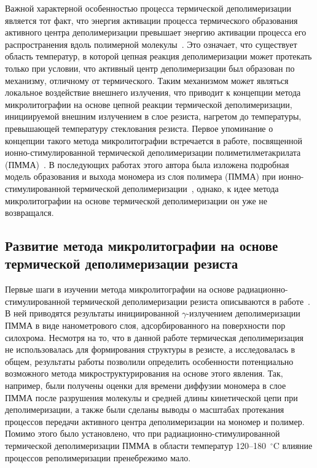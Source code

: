 Важной характерной особенностью процесса термической деполимеризации является тот факт, что энергия активации процесса термического образования активного центра деполимеризации превышает энергию активации процесса его распространения вдоль полимерной молекулы~\cite{Cowley_1952_1, Sanchez-Jimenez_Ea}. Это означает, что существует область температур, в которой цепная реакция деполимеризации может протекать только при условии, что активный центр деполимеризации был образован по механизму, отличному от термического. Таким механизмом может являться локальное воздействие внешнего излучения, что приводит к концепции метода микролитографии на основе цепной реакции термической деполимеризации, инициируемой внешним излучением в слое резиста, нагретом до температуры, превышающей температуру стеклования резиста. Первое упоминание о концепции такого метода микролитографии встречается в работе, посвященной ионно-стимулированной термической деполимеризации полиметилметакрилата \linebreak (ПММА)~\cite{Fragala_1}. В последующих работах этого автора была изложена подробная модель образования и выхода мономера из слоя полимера \linebreak (ПММА) при ионно-стимулированной термической деполимеризации~\cite{Fragala_2,Fragala_3_diffusion}, \linebreak однако, к идее метода микролитографии на основе термической деполимеризации он уже не возвращался.


\subsection{Развитие метода микролитографии на основе термической деполимеризации резиста}
Первые шаги в изучении метода микролитографии на основе радиационно-стимулированной термической деполимеризации резиста описываются в работе~\cite{Bruk_2000}. В ней приводятся результаты инициированной $\gamma$-излучением деполимеризации ПММА в виде нанометрового слоя, адсорбированного на поверхности пор силохрома. Несмотря на то, что в данной работе термическая деполимеризация не использовалась для формирования структуры в резисте, а исследовалась в общем, результаты работы позволили определить особенности потенциально возможного метода микроструктурирования на основе этого явления. Так, например, были получены оценки для времени диффузии мономера в слое ПММА после разрушения молекулы и средней длины кинетической цепи при деполимеризации, а также были сделаны выводы о масштабах протекания процессов передачи активного центра деполимеризации на мономер и полимер. Помимо этого было установлено, что при радиационно-стимулированной термической деполимеризации ПММА в области температур 120--180~$^\circ$C влияние процессов реполимеризации пренебрежимо мало.

